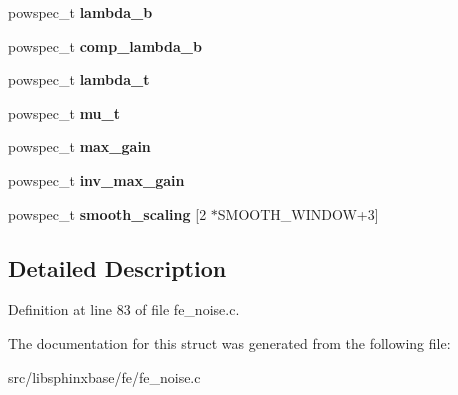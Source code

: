 \begin{DoxyCompactItemize}
\item 
powspec\+\_\+t {\bfseries lambda\+\_\+b}\label{structnoise__stats__s_a56527a4cfd15aac96133ed20989c89c7}

\item 
powspec\+\_\+t {\bfseries comp\+\_\+lambda\+\_\+b}\label{structnoise__stats__s_ac3317afbf629cadc04b41c5657f0140d}

\item 
powspec\+\_\+t {\bfseries lambda\+\_\+t}\label{structnoise__stats__s_a94d5961c9df8d3345821c2f6c4358514}

\item 
powspec\+\_\+t {\bfseries mu\+\_\+t}\label{structnoise__stats__s_ad5cc76a830669ea5fbf0b8f4e4f80652}

\item 
powspec\+\_\+t {\bfseries max\+\_\+gain}\label{structnoise__stats__s_afeda1bf01ce753f6b3e4fb89279cfc63}

\item 
powspec\+\_\+t {\bfseries inv\+\_\+max\+\_\+gain}\label{structnoise__stats__s_ab6b62f1324e05bafa461bdcab8bc1bf3}

\item 
powspec\+\_\+t {\bfseries smooth\+\_\+scaling} [2 $\ast$S\+M\+O\+O\+T\+H\+\_\+\+W\+I\+N\+D\+O\+W+3]\label{structnoise__stats__s_a4bc8cd91479f20703fdf82251ba90e6e}

\end{DoxyCompactItemize}


\subsection{Detailed Description}


Definition at line 83 of file fe\+\_\+noise.\+c.



The documentation for this struct was generated from the following file\+:\begin{DoxyCompactItemize}
\item 
src/libsphinxbase/fe/fe\+\_\+noise.\+c\end{DoxyCompactItemize}
